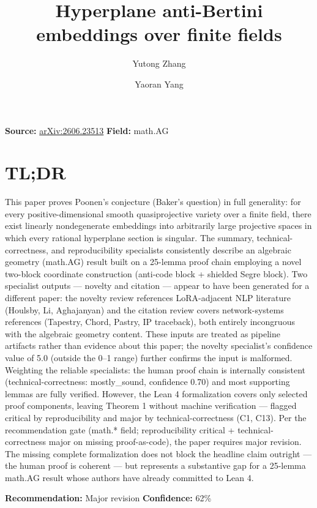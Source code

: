 \documentclass[11pt]{article}
\title{Hyperplane anti-Bertini embeddings over finite fields}
\author{Yutong Zhang \and Yaoran Yang}
\date{}
\begin{document}
\maketitle

\noindent\textbf{Source:} \href{https://arxiv.org/abs/2606.23513}{arXiv:2606.23513} \quad \textbf{Field:} math.AG\\

\section*{TL;DR}
This paper proves Poonen's conjecture (Baker's question) in full generality: for every positive-dimensional smooth quasiprojective variety over a finite field, there exist linearly nondegenerate embeddings into arbitrarily large projective spaces in which every rational hyperplane section is singular. The summary, technical-correctness, and reproducibility specialists consistently describe an algebraic geometry (math.AG) result built on a 25-lemma proof chain employing a novel two-block coordinate construction (anti-code block + shielded Segre block). Two specialist outputs --- novelty and citation --- appear to have been generated for a different paper: the novelty review references LoRA-adjacent NLP literature (Houlsby, Li, Aghajanyan) and the citation review covers network-systems references (Tapestry, Chord, Pastry, IP traceback), both entirely incongruous with the algebraic geometry content. These inputs are treated as pipeline artifacts rather than evidence about this paper; the novelty specialist's confidence value of 5.0 (outside the 0--1 range) further confirms the input is malformed. Weighting the reliable specialists: the human proof chain is internally consistent (technical-correctness: mostly\_sound, confidence 0.70) and most supporting lemmas are fully verified. However, the Lean 4 formalization covers only selected proof components, leaving Theorem 1 without machine verification --- flagged critical by reproducibility and major by technical-correctness (C1, C13). Per the recommendation gate (math.* field; reproducibility critical + technical-correctness major on missing proof-as-code), the paper requires major revision. The missing complete formalization does not block the headline claim outright --- the human proof is coherent --- but represents a substantive gap for a 25-lemma math.AG result whose authors have already committed to Lean 4.

\textbf{Recommendation:} Major revision \quad \textbf{Confidence:} 62\%\\
\end{document}
